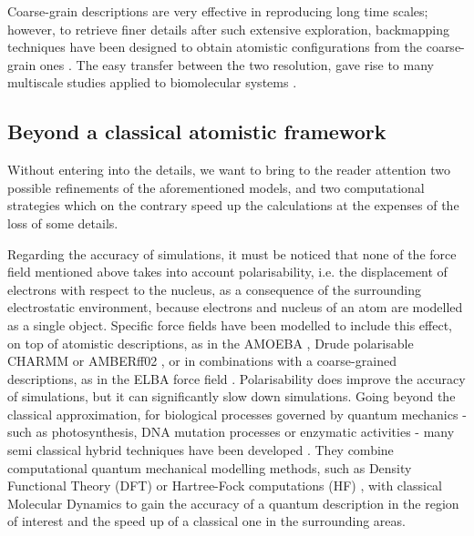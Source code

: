 \documentclass[graybox]{svmult}
\begin{document}
 Coarse-grain descriptions are very effective in reproducing long time scales; however, to retrieve finer details after such extensive exploration, backmapping techniques have been designed to obtain atomistic configurations from the coarse-grain ones \cite{Wassenaar2015}. The easy transfer between the two resolution, gave rise to many multiscale studies applied to biomolecular systems \cite{Lee2012}.


\subsection{Beyond a classical atomistic framework} 

Without entering into the details, we want to bring to the reader attention two possible refinements of the aforementioned models, and two computational strategies which on the contrary speed up the calculations at the expenses of the loss of some details.

Regarding the accuracy of simulations, it must be noticed that none of the force field mentioned above takes into account polarisability, i.e. the displacement of electrons with respect to the nucleus, as a consequence of the surrounding electrostatic environment, because electrons and nucleus of an atom are modelled as a single object. Specific force fields have been modelled to include this effect, on top of atomistic descriptions, as in the AMOEBA \cite{Ren2003,Ponder2010}, Drude polarisable CHARMM \cite{Anisimov2004} or AMBERff02 \cite{Cieplak2001}, or in combinations with a coarse-grained descriptions, as in the ELBA force field \cite{Orsi2011}. Polarisability does improve the accuracy of simulations, but it can significantly slow down simulations.
%
Going beyond the classical approximation, for biological processes governed by quantum mechanics - such as photosynthesis, DNA mutation processes or enzymatic activities - many semi classical hybrid techniques have been developed \cite{Ahmadi2018}. They combine computational quantum mechanical modelling methods, such as Density Functional Theory (DFT) or Hartree-Fock computations (HF) \cite{Shao2015}, with classical Molecular Dynamics to gain the accuracy of a quantum description in the region of interest and the speed up of a classical one in the surrounding areas.
\end{document}
